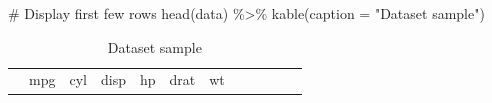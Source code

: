 \documentclass[
  letterpaper,
  DIV=11,
  numbers=noendperiod]{scrartcl}
\newenvironment{Shaded}{\begin{snugshade}}{\end{snugshade}}
\newcommand{\AttributeTok}[1]{\textcolor[rgb]{0.40,0.45,0.13}{#1}}
\newcommand{\CommentTok}[1]{\textcolor[rgb]{0.37,0.37,0.37}{#1}}
\newcommand{\FunctionTok}[1]{\textcolor[rgb]{0.28,0.35,0.67}{#1}}
\newcommand{\NormalTok}[1]{\textcolor[rgb]{0.00,0.23,0.31}{#1}}
\newcommand{\SpecialCharTok}[1]{\textcolor[rgb]{0.37,0.37,0.37}{#1}}
\newcommand{\StringTok}[1]{\textcolor[rgb]{0.13,0.47,0.30}{#1}}
\begin{document}
\begin{Shaded}
\begin{Highlighting}[]
\CommentTok{\# Display first few rows}
\FunctionTok{head}\NormalTok{(data) }\SpecialCharTok{\%\textgreater{}\%}
  \FunctionTok{kable}\NormalTok{(}\AttributeTok{caption =} \StringTok{"Dataset sample"}\NormalTok{)}
\end{Highlighting}
\end{Shaded}

\begin{longtable}[]{@{}
  >{\raggedright\arraybackslash}p{}
  >{\raggedleft\arraybackslash}p{}
  >{\raggedleft\arraybackslash}p{}
  >{\raggedleft\arraybackslash}p{}
  >{\raggedleft\arraybackslash}p{}
  >{\raggedleft\arraybackslash}p{}
  >{\raggedleft\arraybackslash}p{}
  >{\raggedleft\arraybackslash}p{}
  >{\raggedleft\arraybackslash}p{}
  >{\raggedleft\arraybackslash}p{}
  >{\raggedleft\arraybackslash}p{}
  >{\raggedleft\arraybackslash}p{}@{}}
\caption{Dataset sample}\tabularnewline
\toprule\noalign{}
\begin{minipage}[b]{\linewidth}\raggedright
\end{minipage} & \begin{minipage}[b]{\linewidth}\raggedleft
mpg
\end{minipage} & \begin{minipage}[b]{\linewidth}\raggedleft
cyl
\end{minipage} & \begin{minipage}[b]{\linewidth}\raggedleft
disp
\end{minipage} & \begin{minipage}[b]{\linewidth}\raggedleft
hp
\end{minipage} & \begin{minipage}[b]{\linewidth}\raggedleft
drat
\end{minipage} & \begin{minipage}[b]{\linewidth}\raggedleft
wt
\end{minipage} & \begin{minipage}[b]{\linewidth}\raggedleft

\end{minipage}
\end{longtable}
\end{document}
